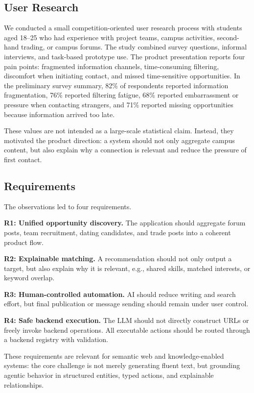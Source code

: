 \documentclass[sigconf]{acmart}
\begin{document}
\subsection{User Research}
We conducted a small competition-oriented user research process with students aged 18--25 who had experience with project teams, campus activities, second-hand trading, or campus forums. The study combined survey questions, informal interviews, and task-based prototype use. The product presentation reports four pain points: fragmented information channels, time-consuming filtering, discomfort when initiating contact, and missed time-sensitive opportunities. In the preliminary survey summary, 82\% of respondents reported information fragmentation, 76\% reported filtering fatigue, 68\% reported embarrassment or pressure when contacting strangers, and 71\% reported missing opportunities because information arrived too late.

These values are not intended as a large-scale statistical claim. Instead, they motivated the product direction: a system should not only aggregate campus content, but also explain why a connection is relevant and reduce the pressure of first contact.

\subsection{Requirements}
The observations led to four requirements.

\textbf{R1: Unified opportunity discovery.} The application should aggregate forum posts, team recruitment, dating candidates, and trade posts into a coherent product flow.

\textbf{R2: Explainable matching.} A recommendation should not only output a target, but also explain why it is relevant, e.g., shared skills, matched interests, or keyword overlap.

\textbf{R3: Human-controlled automation.} AI should reduce writing and search effort, but final publication or message sending should remain under user control.

\textbf{R4: Safe backend execution.} The LLM should not directly construct URLs or freely invoke backend operations. All executable actions should be routed through a backend registry with validation.

These requirements are relevant for semantic web and knowledge-enabled systems: the core challenge is not merely generating fluent text, but grounding agentic behavior in structured entities, typed actions, and explainable relationships.
\end{document}
